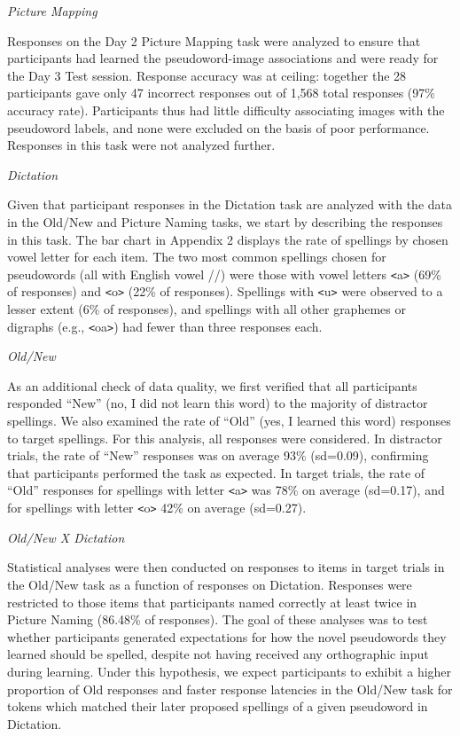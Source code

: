 \documentclass[
  english,
  man,floatsintext]{apa7}
\newcounter{none} %
\begin{document}
\emph{Picture Mapping}

Responses on the Day 2 Picture Mapping task were analyzed to ensure that participants had learned the pseudoword-image associations and were ready for the Day 3 Test session. Response accuracy was at ceiling: together the 28 participants gave only 47 incorrect responses out of 1,568 total responses (97\% accuracy rate). Participants thus had little difficulty associating images with the pseudoword labels, and none were excluded on the basis of poor performance. Responses in this task were not analyzed further.

\emph{Dictation}

Given that participant responses in the Dictation task are analyzed with the data in the Old/New and Picture Naming tasks, we start by describing the responses in this task. The bar chart in Appendix 2 displays the rate of spellings by chosen vowel letter for each item. The two most common spellings chosen for pseudowords (all with English vowel /\textscripta /) were those with vowel letters \texttt{\textless{}}a\texttt{\textgreater{}} (69\% of responses) and \texttt{\textless{}}o\texttt{\textgreater{}} (22\% of responses). Spellings with \texttt{\textless{}}u\texttt{\textgreater{}} were observed to a lesser extent (6\% of responses), and spellings with all other graphemes or digraphs (e.g., \texttt{\textless{}}oa\texttt{\textgreater{}}) had fewer than three responses each.

\emph{Old/New}

As an additional check of data quality, we first verified that all participants responded ``New'' (no, I did not learn this word) to the majority of distractor spellings. We also examined the rate of ``Old'' (yes, I learned this word) responses to target spellings. For this analysis, all responses were considered. In distractor trials, the rate of ``New'' responses was on average 93\% (sd=0.09), confirming that participants performed the task as expected.
In target trials, the rate of ``Old'' responses for spellings with letter \texttt{\textless{}}a\texttt{\textgreater{}} was 78\% on average (sd=0.17), and for spellings with letter \texttt{\textless{}}o\texttt{\textgreater{}} 42\% on average (sd=0.27).

\emph{Old/New X Dictation}

Statistical analyses were then conducted on responses to items in target trials in the Old/New task as a function of responses on Dictation. Responses were restricted to those items that participants named correctly at least twice in Picture Naming (86.48\% of responses). The goal of these analyses was to test whether participants generated expectations for how the novel pseudowords they learned should be spelled, despite not having received any orthographic input during learning. Under this hypothesis, we expect participants to exhibit a higher proportion of Old responses and faster response latencies in the Old/New task for tokens which matched their later proposed spellings of a given pseudoword in Dictation.
\end{document}
